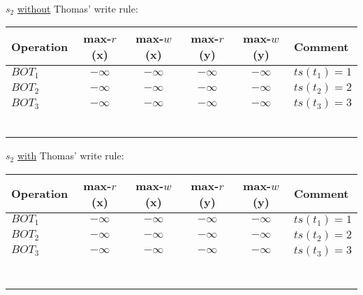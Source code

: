 \ \\

$s_2$ \underline{without} Thomas' write rule:
\begin{table}[H]
\centering
\begin{tabular}{|l|c|c|c|c|l|}
\hline
Operation & max-$r$(x) & max-$w$(x) & max-$r$(y) & max-$w$(y) &  Comment \\
\hline\hline
$BOT_1$ & $-\infty$ & $-\infty$ & $-\infty$ & $-\infty$ & $ts(t_1) = 1$ \\ \hline
$BOT_2$ & $-\infty$ & $-\infty$ & $-\infty$ & $-\infty$ & $ts(t_2) = 2$ \\ \hline
$BOT_3$ & $-\infty$ & $-\infty$ & $-\infty$ & $-\infty$ & $ts(t_3) = 3$ \\ \hline
& & & & &   \\[5pt]\hline
& & & & &   \\[5pt]\hline
& & & & &   \\[5pt]\hline
& & & & &   \\[5pt]\hline
& & & & &   \\[5pt]\hline
& & & & &   \\[5pt]\hline
\end{tabular}
\end{table}
\newpage
$s_2$ \underline{with} Thomas' write rule:
\begin{table}[H]
\centering
\begin{tabular}{|l|c|c|c|c|l|}
\hline
Operation & max-$r$(x) & max-$w$(x) & max-$r$(y) & max-$w$(y) &  Comment \\
\hline\hline
$BOT_1$ & $-\infty$ & $-\infty$ & $-\infty$ & $-\infty$ & $ts(t_1) = 1$ \\ \hline
$BOT_2$ & $-\infty$ & $-\infty$ & $-\infty$ & $-\infty$ & $ts(t_2) = 2$ \\ \hline
$BOT_3$ & $-\infty$ & $-\infty$ & $-\infty$ & $-\infty$ & $ts(t_3) = 3$ \\ \hline
& & & & &   \\[5pt]\hline
& & & & &   \\[5pt]\hline
& & & & &   \\[5pt]\hline
& & & & &   \\[5pt]\hline
& & & & &   \\[5pt]\hline
& & & & &   \\[5pt]\hline
& & & & &   \\[5pt]\hline
\end{tabular}
\end{table}


